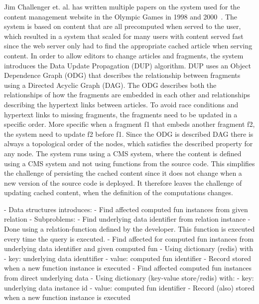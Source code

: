 
Jim Challenger et. al. has written multiple papers on the system used for the content management website in the Olympic Games in 1998 and 2000~\cite{paper:ibm, paper:ibm-extended}. The system is based on content that are all precomputed when served to the user, which resulted in a system that scaled for many users with content served fast since the web server only had to find the appropriate cached article when serving content. In order to allow editors to change articles and fragments, the system introduces the Data Update Propagation (DUP) algorithm. DUP uses an Object Dependence Graph (ODG) that describes the relationship between fragments using a Directed Acyclic Graph (DAG). The ODG describes both the relationships of how the fragments are embedded in each other and relationships describing the hypertext links between articles. To avoid race conditions and hypertext links to missing fragments, the fragments need to be updated in a specific order. More specific when a fragment f1 that embeds another fragment f2, the system need to update f2 before f1. Since the ODG is described DAG there is always a topological order of the nodes, which satisfies the described property for any node. The system runs using a CMS system, where the content is defined using a CMS system and not using functions from the source code. This simplifies the challenge of persisting the cached content since it does not change when a new version of the source code is deployed. It therefore leaves the challenge of updating cached content, when the definition of the computations changes.

- Data structures introduces:
  - Find affected computed fun instances from given relation
    - Subproblems:
      - Find underlying data identifier from relation instance
        - Done using a relation-function defined by the developer. This
          function is executed every time the query is executed.
      - Find affected for computed fun instances from underlying data identifier and given computed fun
        - Using dictionary (redis) with
          - key: underlying data identtifier
          - value: computed fun identifier
        - Record stored when a new function instance is executed
  - Find affected computed fun instances from direct underlying data
    - Using dictionary (key-value store/redis) with:
      - key: underlying data instance id
      - value: computed fun identifier
    - Record (also) stored when a new function instance is executed

